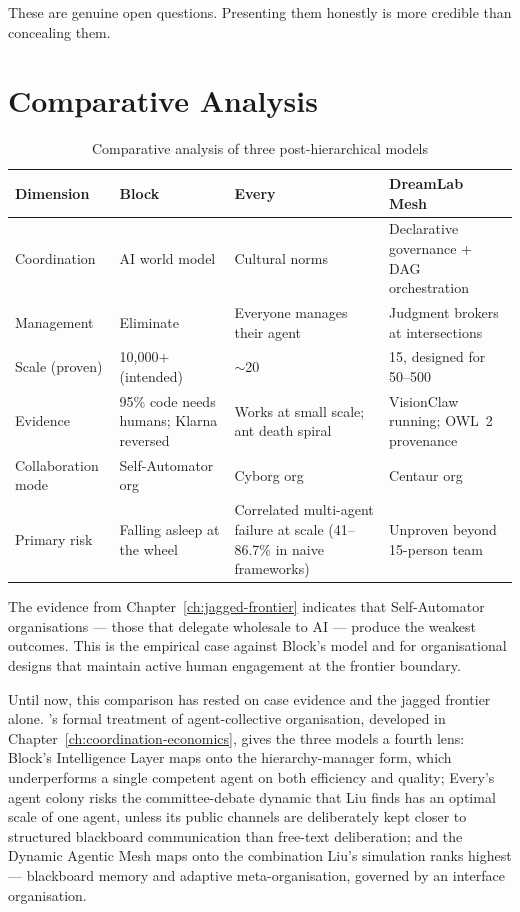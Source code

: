 These are genuine open questions. Presenting them honestly is more credible than concealing them.

\section{Comparative Analysis}

\begin{table}[h]
\centering
\caption{Comparative analysis of three post-hierarchical models}
\label{tab:three-models}
\begin{tabularx}{\textwidth}{l L{3cm} L{3cm} X}
\toprule
\textbf{Dimension} & \textbf{Block} & \textbf{Every} & \textbf{DreamLab Mesh} \\
\midrule
Coordination & AI world model & Cultural norms & Declarative governance + DAG orchestration \\
\addlinespace
Management & Eliminate & Everyone manages their agent & Judgment brokers at intersections \\
\addlinespace
Scale (proven) & 10,000+ (intended) & $\sim$20 & 15, designed for 50--500 \\
\addlinespace
Evidence & 95\% code needs humans; Klarna reversed & Works at small scale; ant death spiral & VisionClaw running; OWL~2 provenance \\
\addlinespace
Collaboration mode & Self-Automator org & Cyborg org & Centaur org \\
\addlinespace
Primary risk & Falling asleep at the wheel & Correlated multi-agent failure at scale (41--86.7\% in naive frameworks) & Unproven beyond 15-person team \\
\bottomrule
\end{tabularx}
\end{table}

The evidence from Chapter~\ref{ch:jagged-frontier} indicates that Self-Automator organisations --- those that delegate wholesale to AI --- produce the weakest outcomes. This is the empirical case against Block's model and for organisational designs that maintain active human engagement at the frontier boundary.

Until now, this comparison has rested on case evidence and the jagged frontier alone. \textcite{Liu2026}'s formal treatment of agent-collective organisation, developed in Chapter~\ref{ch:coordination-economics}, gives the three models a fourth lens: Block's Intelligence Layer maps onto the hierarchy-manager form, which underperforms a single competent agent on both efficiency and quality; Every's agent colony risks the committee-debate dynamic that Liu finds has an optimal scale of one agent, unless its public channels are deliberately kept closer to structured blackboard communication than free-text deliberation; and the Dynamic Agentic Mesh maps onto the combination Liu's simulation ranks highest --- blackboard memory and adaptive meta-organisation, governed by an interface organisation.
